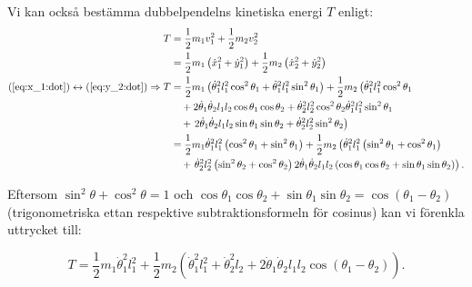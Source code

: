 Vi kan också bestämma dubbelpendelns kinetiska energi $T$ enligt:
\begin{align}
    T   &= \frac{1}{2} m_1 v_{1}^{2} + \frac{1}{2}m_2v_2^2 \notag \\
        &= \frac{1}{2}m_1\left(\dot{x}_1^2 + \dot{y}_1^2\right) + \frac{1}{2}m_2\left(\dot{x}_2^2 + \dot{y}_2^2\right) \notag \\ %
    (\ref{eq:x_1:dot}) \leftrightarrow (\ref{eq:y_2:dot}) \Rightarrow T &= \frac{1}{2}m_1\left(\dot{\theta}_1^2 l_1^2 \cos^2{\theta_1} + \dot{\theta}_1^2 l_1^2 \sin^2{\theta_1}\right) + \frac{1}{2}m_2
    \left(
        \dot{\theta}_1^2 l_1^2 \cos^2{\theta_1}\right. \notag \\
        &\quad + 2\dot{\theta}_1\dot{\theta}_2l_1l_2\cos{\theta_1}\cos{\theta_2}
        + \dot{\theta}_2^2l_2^2\cos^2{\theta_2} \dot{\theta}_1^2l_1^2\sin^2{\theta_1} \notag \\
        &\quad + \left.2\dot{\theta}_1\dot{\theta}_2l_1l_2\sin{\theta_1}\sin{\theta_2} + \dot{\theta}_2^2l_2^2\sin^2{\theta_2}
    \right) \notag \\
    &= \frac{1}{2}m_1\dot{\theta}_1^2l_1^2\left(\cos^2{\theta_1} + \sin^2{\theta_1}\right) + \frac{1}{2}m_2\left( \dot{\theta}_1^2l_1^2\left(\sin^2{\theta_1} + \cos^2{\theta_1}\right) \right. \notag \\
    &\quad + \left.\dot{\theta}_2^2l_2^2\left(\sin^2{\theta_2} + \cos^2{\theta_2}\right) 2\dot{\theta}_1\dot{\theta}_2l_1l_2\left(\cos{\theta_1}\cos{\theta_2} + \sin{\theta_1}\sin{\theta_2}\right)\right). \notag
\end{align}

Eftersom $\sin^2{\theta} + \cos^2{\theta} = 1$ och $\cos{\theta_1}\cos{\theta_2} + \sin{\theta_1}\sin{\theta_2} = \cos(\theta_1 - \theta_2)$ (trigonometriska ettan respektive subtraktionsformeln för cosinus) kan vi förenkla uttrycket till:

\begin{equation}
    T = \frac{1}{2}m_1\dot{\theta}_1^2l_1^2 + \frac{1}{2}m_2\left(\dot{\theta}_1^2l_1^2 + \dot{\theta}_2^2l_2 + 2\dot{\theta}_1\dot{\theta}_2l_1l_2\cos(\theta_1-\theta_2)\right). \label{eq:T/kinetic_energy_simplified}
\end{equation}

